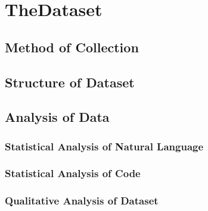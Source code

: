 \chapter{TheDataset}
\label{the_dataset}

\section{Method of Collection} %
\label{sec:method_of_collection}


\section{Structure of Dataset} %
\label{sec:structure_of_dataset}


\section{Analysis of Data} %
\label{sec:analysis_of_data}

\subsection{Statistical Analysis of Natural Language} %
\label{sub:statistical_analysis_of_natural_language}


\subsection{Statistical Analysis of Code} %
\label{sub:statistical_analysis_of_code}


\subsection{Qualitative Analysis of Dataset} %
\label{sub:qualitative_analysis_}

